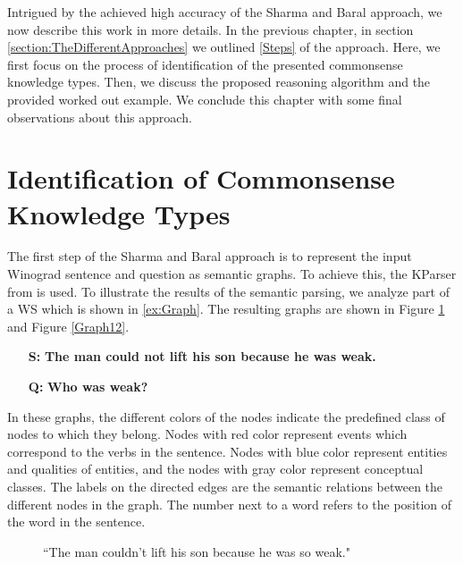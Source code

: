 \label{knowledge_types}
Intrigued by the achieved high accuracy of the Sharma and Baral \cite{2018CommonsenseKT} approach, we now describe this work in more details. In the previous chapter, in section \ref{section:TheDifferentApproaches} we outlined \underline{\ref{Steps}} of the approach. Here, we first focus on the process of identification of the presented commonsense knowledge types. Then, we discuss the proposed reasoning algorithm and the provided worked out example. We conclude this chapter with some final observations about this approach.


\section{Identification of Commonsense Knowledge Types}
The first step of the Sharma and Baral \cite{2018CommonsenseKT} approach is to represent the input Winograd sentence and question as semantic graphs. To achieve this, the KParser from \cite{DBLP:conf/ijcai/SharmaVAB15} is used. 
To illustrate the results of the semantic parsing, we analyze part of a WS which is shown in \ref{ex:Graph}. The  resulting graphs are shown in Figure \ref{Graph11} and Figure \ref{Graph12}. \\ 
\begin{itemize}
	\item[\textbf{S:}] \textbf{The man could not lift his son because he was weak.}
	\item[\textbf{Q:}] \textbf{Who was weak?}
\end{itemize}

In these graphs, the different colors of the nodes indicate the predefined class of nodes to which they belong. 
Nodes with red color represent events which correspond to the verbs in the sentence. Nodes with blue color represent entities and qualities of entities, and the nodes with gray color represent conceptual classes. The labels on the directed edges are the semantic relations between the different nodes in the graph. The number next to a word refers to the position of the word in the sentence. 
\begin{figure}
	\centering
	
	\caption{\label{Graph11}``The man couldn't lift his son because he was so weak."}
\end{figure}


